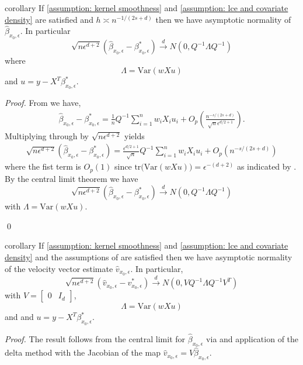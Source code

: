 \documentclass[11pt]{article}
\begin{document}
\begin{restatable}{corollary}{} \label{thm: central limit for beta}
    If \cref{assumption: kernel smoothness} and \cref{assumption: lce and covariate density} are satisfied and $h \asymp n^{-1/(2s+d)}$ then we have asymptotic normality of $\hat{\beta}_{x_0,\epsilon}$. In particular
    \[\sqrt{n\epsilon^{d+2}}(\hat{\beta}_{x_0, \epsilon} - \beta^*_{x_0, \epsilon}) \overset{d}{\rightarrow} N(0, Q^{-1}\Lambda Q^{-1})\]
    where 
    \[\Lambda = \text{Var}(wXu)\]
    and $u = y - X^T\beta_{x_0, \epsilon}^*$.
\end{restatable}
\noindent\textit{Proof.} From  we have, 
\begin{align}
    \hat{\beta}_{x_0, \epsilon} - \beta^*_{x_0, \epsilon} = \frac{1}{n}Q^{-1}\sum_{i = 1}^nw_iX_iu_i 
    + O_p\left(\frac{n^{-s/(2s+d)}}{\sqrt{n}\epsilon^{d/2+1}}\right).
\end{align}
Multiplying through by $\sqrt{n\epsilon^{d+2}}$ yields
\begin{align}
    \sqrt{n\epsilon^{d+2}}(\hat{\beta}_{x_0, \epsilon} - \beta^*_{x_0, \epsilon}) = \frac{\epsilon^{d/2 + 1}}{\sqrt{n}}Q^{-1}\sum_{i = 1}^nw_iX_iu_i 
    + O_p\left(n^{-s/(2s+d)}\right)
\end{align}
where the fist term is $O_p(1)$ since $\text{tr(}\text{Var}(wXu)) = \epsilon^{-(d+2)}$ as indicated by .
By the central limit theorem we have
\begin{equation}
     \sqrt{n\epsilon^{d+2}}(\hat{\beta}_{x_0, \epsilon} - \beta_{x_0, \epsilon}^*) \overset{d}{\rightarrow} N(0, Q^{-1}\Lambda Q^{-1})
\end{equation}
with $\Lambda = \text{Var}(wXu)$. 

\qed{}

\begin{restatable}{corollary}{} \label{corr: central limit for v}
    If \cref{assumption: kernel smoothness} and \cref{assumption: lce and covariate density} and the assumptions of  are satisfied then we have asymptotic normality of the velocity vector estimate $\hat{v}_{x_0, \epsilon}$. In particular,
    \[\sqrt{n\epsilon^{d+2}}(\hat{v}_{x_0, \epsilon} - v^*_{x_0, \epsilon}) \overset{d}{\rightarrow}N(0, VQ^{-1}\Lambda Q^{-1}V^T)\]
    with $V = \begin{bmatrix}
        0 & I_d
    \end{bmatrix}$, 
    \[\Lambda = \text{Var}(wXu)\]
    and and $u = y - X^T\beta_{x_0, \epsilon}^*$.
\end{restatable}
\noindent \textit{Proof.} The result follows from the central limit for $\hat{\beta}_{x_0, \epsilon}$ via  and application of the delta method with the Jacobian of the map $\hat{v}_{x_0, \epsilon} = V\hat{\beta}_{x_0, \epsilon}$. 
\end{document}
